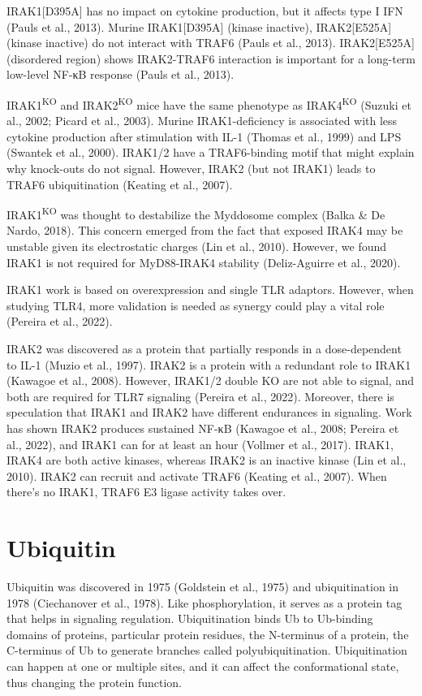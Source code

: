 IRAK1[D395A] has no impact on cytokine production, but it affects type I IFN (Pauls et al., 2013). Murine IRAK1[D395A] (kinase inactive), IRAK2[E525A] (kinase inactive) do not interact with TRAF6 (Pauls et al., 2013). IRAK2[E525A] (disordered region) shows IRAK2-TRAF6 interaction is important for a long-term low-level NF-κB response (Pauls et al., 2013).

IRAK1\textsuperscript{KO} and IRAK2\textsuperscript{KO} mice have the same phenotype as IRAK4\textsuperscript{KO} (Suzuki et al., 2002; Picard et al., 2003). Murine IRAK1-deficiency is associated with less cytokine production after stimulation with IL-1{\textbeta} (Thomas et al., 1999) and LPS (Swantek et al., 2000). IRAK1/2 have a TRAF6-binding motif that might explain why knock-outs do not signal. However, IRAK2 (but not IRAK1) leads to TRAF6 ubiquitination (Keating et al., 2007).

IRAK1\textsuperscript{KO} was thought to destabilize the Myddosome complex (Balka \& De Nardo, 2018). This concern emerged from the fact that exposed IRAK4 may be unstable given its electrostatic charges (Lin et al., 2010). However, we found IRAK1 is not required for MyD88-IRAK4 stability (Deliz-Aguirre et al., 2020).

IRAK1 work is based on overexpression and single TLR adaptors. However, when studying TLR4, more validation is needed as synergy could play a vital role (Pereira et al., 2022).

IRAK2 was discovered as a protein that partially responds in a dose-dependent to IL-1{\textbeta} (Muzio et al., 1997). IRAK2 is a protein with a redundant role to IRAK1 (Kawagoe et al., 2008). However, IRAK1/2 double KO are not able to signal, and both are required for TLR7 signaling (Pereira et al., 2022). Moreover, there is speculation that IRAK1 and IRAK2 have different endurances in signaling. Work has shown IRAK2 produces sustained NF-κB (Kawagoe et al., 2008; Pereira et al., 2022), and IRAK1 can for at least an hour (Vollmer et al., 2017). IRAK1, IRAK4 are both active kinases, whereas IRAK2 is an inactive kinase (Lin et al., 2010). IRAK2 can recruit and activate TRAF6 (Keating et al., 2007). When there’s no IRAK1, TRAF6 E3 ligase activity takes over.

\section{Ubiquitin}
Ubiquitin was discovered in 1975 (Goldstein et al., 1975) and ubiquitination in 1978 (Ciechanover et al., 1978). Like phosphorylation, it serves as a protein tag that helps in signaling regulation. Ubiquitination binds Ub to Ub-binding domains of proteins, particular protein residues, the N-terminus of a protein, the C-terminus of Ub to generate branches called polyubiquitination. Ubiquitination can happen at one or multiple sites, and it can affect the conformational state, thus changing the protein function.

